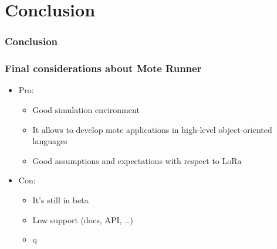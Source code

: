 \section{Conclusion} 
\begin{frame}[fragile]
  \frametitle{Conclusion}
\end{frame}

\begin{frame}[fragile]
  \frametitle{Final considerations about Mote Runner}
   \begin{itemize}
    \item Pro:
    \begin{itemize}
      \item Good simulation environment
      \item It allows to develop mote applications in high-level object-oriented languages
      \item Good assumptions and expectations with respect to LoRa
    \end{itemize}
    \item Con:
    \begin{itemize}
      \item It's still in beta
      \item Low support (docs, API, \dots)
      \item q
    \end{itemize}
  \end{itemize}
\end{frame}
